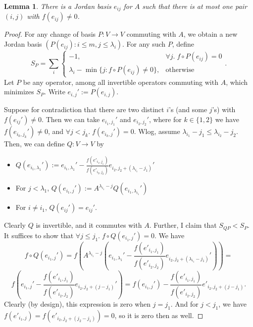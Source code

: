 \documentclass[12pt,psamsfonts]{article}
\newtheorem{lemma}[theorem]{Lemma}
\begin{document}
\begin{lemma}
    There is a Jordan basis \(e_{ij}\) for \(A\) such that there is at most one pair \((i, j)\) with \(f(e_{ij}) \neq 0\).
\end{lemma}
\begin{proof}
    For any change of basis \(P : V \to V\) commuting with \(A\), we obtain a new Jordan basis \((P(e_{ij}) : i \leq m, j \leq \lambda_i)\).
    For any such \(P\), define 
    \[S_P = \sum_i \begin{cases}-1, & \forall j. \; f \circ P(e_{ij}) = 0 \\ \lambda_i - \min\{j : f \circ P(e_{ij}) \neq 0\}, & \textrm{otherwise} \end{cases}.\]
    Let \(P\) be any operator, among all invertible operators commuting with \(A\), which minimizes \(S_P\).
    Write \(e_{i,j}' := P(e_{i,j})\).
    \par Suppose for contradiction that there are two distinct \(i\)'s (and some \(j\)'s) with \(f(e_{ij}') \neq 0\).
    Then we can take \(e_{i_1, j_1}'\) and \(e_{i_2, j_2}'\), where for \(k \in \{1,2\}\) we have \(f(e_{i_k, j_k}') \neq 0\), and \(\forall j < j_k. \; f(e_{i_k, j}') = 0\).
    Wlog, assume \(\lambda_{i_1} - j_1 \leq \lambda_{i_2} - j_2\).
    Then, we can define \(Q : V \to V\) by
    \begin{itemize}
        \item \(Q(e_{i_1, \lambda_1}') := e_{i_1, \lambda_1}' - \frac{f(e'_{i_1, j_1})}{f(e'_{i_2, j_2})}e_{i_2, j_2 + (\lambda_{i_1} - j_1)}'\)
        \item For \(j < \lambda_1\), \(Q(e_{i_1, j}') := A^{\lambda_{i_1} - j} Q(e_{i_1, \lambda_{i_1}}')\)
        \item For \(i \neq i_1\), \(Q(e_{ij}') = e_{ij}'\).
    \end{itemize}
    Clearly \(Q\) is invertible, and it commutes with \(A\).
    Further, I claim that \(S_{QP}  < S_P\).
    It suffices to show that \(\forall j \leq j_1. \; f \circ Q(e_{i_1,j}') = 0\).
    We have 
    \[f \circ Q(e_{i_1,j}') = f\left(A^{\lambda_{i_1} - j}\left(e_{i_1, \lambda_1}' - \frac{f(e'_{i_1, j_1})}{f(e'_{i_2, j_2})}e_{i_2, j_2 + (\lambda_{i_1} - j_1)}'\right)\right) =\]
    \[f\left(e_{i_1, j}' - \frac{f(e'_{i_1, j_1})}{f(e'_{i_2, j_2})} e_{i_2, j_2 + (j - j_1)}'\right) = f(e_{i_1, j}') - \frac{f(e'_{i_1, j_1})}{f(e'_{i_2, j_2})} e'_{i_2, j_2 + (j - j_1)}.\]
    Clearly (by design), this expression is zero when \(j = j_1\).
    And for \(j < j_1\), we have \(f(e'_{i_1, j}) = f(e'_{i_2, j_2 + (j_2 - j_1)}) = 0\), so it is zero then as well.

\end{proof}
\end{document}
